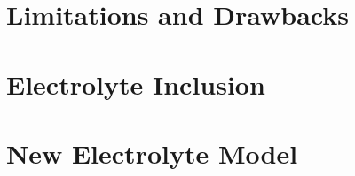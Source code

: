 \section{Limitations and Drawbacks}\label{subsec:basicspmlimitations}

\section{Electrolyte Inclusion}\label{sec:electrolyteinclusion}


\section{New Electrolyte Model}\label{sec:newelectrolytemodel}




